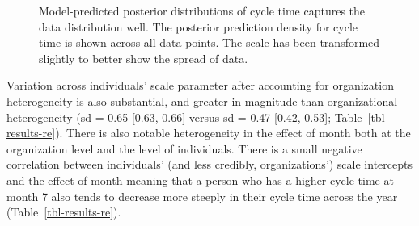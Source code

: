 \documentclass[manuscript,screen,review]{acmart}
\begin{document}
\begin{figure}


\caption[Model-predicted posterior distributions of cycle time captures
the data distribution well]{\label{fig-pp-check-sum}Model-predicted
posterior distributions of cycle time captures the data distribution
well. The posterior prediction density for cycle time is shown across
all data points. The scale has been transformed slightly to better show
the spread of data.}

\end{figure}%

Variation across individuals' scale parameter after accounting for
organization heterogeneity is also substantial, and greater in magnitude
than organizational heterogeneity (sd = 0.65 {[}0.63, 0.66{]} versus sd
= 0.47 {[}0.42, 0.53{]}; Table~\ref{tbl-results-re}). There is also
notable heterogeneity in the effect of month both at the organization
level and the level of individuals. There is a small negative
correlation between individuals' (and less credibly, organizations')
scale intercepts and the effect of month meaning that a person who has a
higher cycle time at month 7 also tends to decrease more steeply in
their cycle time across the year (Table~\ref{tbl-results-re}).
\end{document}
